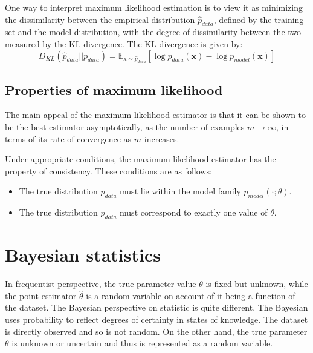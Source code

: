 One way to interpret maximum likelihood estimation is to view it as minimizing the dissimilarity between the empirical distribution $\hat{p}_{data}$, defined by the training set and the model distribution, with the degree of dissimilarity between the two measured by the KL divergence.
The KL divergence is given by:
\begin{equation}
  \label{eq:kl-divergence}
  D_{KL}(\hat{p}_{data}||p_{data}) = \mathbb{E}_{\mathrm{x}\sim \hat{p}_{data}} [\log \hat{p}_{data}(\bm{x}) - \log p_{model}(\bm{x})]
\end{equation}

\subsection{Properties of maximum likelihood}

The main appeal of the maximum likelihood estimator is that it can be shown to be the best estimator asymptotically, as the number of examples $m \rightarrow \infty$, in terms of its rate of convergence as $m$ increases.

Under appropriate conditions, the maximum likelihood estimator has the property of consistency.
These conditions are as follows:
\begin{itemize}
\item The true distribution $p_{data}$ must lie within the model family $p_{model}(\cdot;\theta)$.
\item The true distribution $p_{data}$ must correspond to exactly one value of $\theta$.
\end{itemize}



\section{Bayesian statistics}

In frequentist perspective, the true parameter value $\theta$ is fixed but unknown, while the point estimator $\hat{\theta}$ is a random variable on account of it being a function of the dataset.
The Bayesian perspective on statistic is quite different.
The Bayesian uses probability to reflect degrees of certainty in states of knowledge.
The dataset is directly observed and so is not random.
On the other hand, the true parameter $\theta$ is unknown or uncertain and thus is represented as a random variable.



